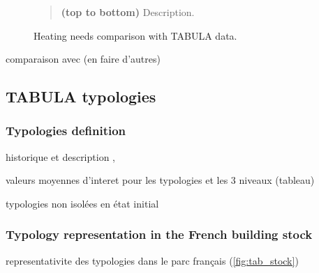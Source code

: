 \documentclass[11pt]{article}
\begin{document}
\begin{figure}[ht]
            \caption{\label{fig:tabula_verif} Heating needs comparison with TABULA data.}
                \begin{quote}
                    \vspace{-2mm}
                    \small\noindent
                    \textbf{(top to bottom)} Description. 
                \end{quote}
        \end{figure}  

        comparaison avec \textcite{pomianowski_method_2023} (en faire d'autres)


    \clearpage
    \subsection{TABULA typologies} %
    \label{sub:tabula_typologies}
    
        \subsubsection{Typologies definition} %
        \label{ssub:typologies_definition}
        
        historique et description
        \cite{pouget_consultants_batiments_2015}, \cite{loga_tabula_2016}

        valeurs moyennes d'interet pour les typologies et les 3 niveaux (tableau)

        typologies non isolées en état initial 

        \subsubsection{Typology representation in the French building stock} %
        \label{ssub:typologies_distribution}
        
        representativite des typologies dans le parc français (\ref{fig:tab_stock})
\end{document}
